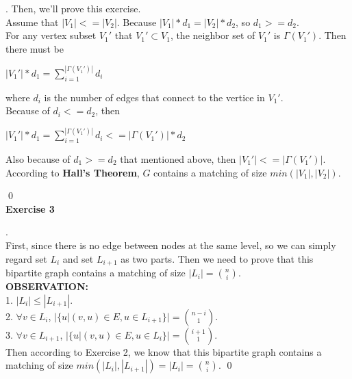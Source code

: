 \documentclass[12pt, notitlepage]{article}
\newenvironment{sol}
  {\par\vspace{3mm}\noindent{\it Solution}.}{\qed}
\begin{document}
\begin{sol}
Then, we'll prove this exercise.\\
Assume that $|V_1| <= |V_2|$. Because $|V_1|*d_1 = |V_2|*d_2$, so $d_1 >= d_2$.\\
For any vertex subset $V_1'$ that $V_1'\subset V_1$, the neighbor set of $V_1'$ is $\Gamma (V_1')$. Then there must be
\centerline{$|V_1'|*d_1 = \sum\limits^{|\Gamma (V_1')|}_{i=1}d_i$}
where $d_i$ is the number of edges that connect to the vertice in $V_1'$.\\
Because of $d_i <= d_2$, then\\
\centerline{$|V_1'|*d_1 = \sum\limits^{|\Gamma (V_1')|}_{i=1}d_i <= |\Gamma (V_1')| * d_2$}
Also because of $d_1 >= d_2$ that mentioned above, then $|V_1'| <= |\Gamma (V_1')|$.\\
According to \textbf{Hall's Theorem},  $G$ contains a matching of size $min(|V_1|, |V_2|)$.

\end{sol}\\


\textbf{Exercise 3}
\begin{sol}\\
First, since there is no edge between nodes at the same level, so we can simply regard set $L_i$ and set $L_{i+1}$ as two parts. Then we need to prove that this bipartite graph contains a matching of size $|L_i|=\binom{n}{i}$.\\
\textbf{OBSERVATION:}\\
1. $|L_i|\leq |L_{i+1}|$.\\
2. $\forall v\in L_i$, $|\{u|(v,u)\in E, u\in L_{i+1}\}|=\binom{n-i}{1}$.\\
3. $\forall v\in L_{i+1}$, $|\{u|(v,u)\in E, u\in L_i\}|=\binom{i+1}{1}$.\\
Then according to Exercise 2, we know that this bipartite graph contains a matching of size $min(|L_i|,|L_{i+1}|)=|L_i|=\binom{n}{i}$.
\end{sol}\\
\end{document}

